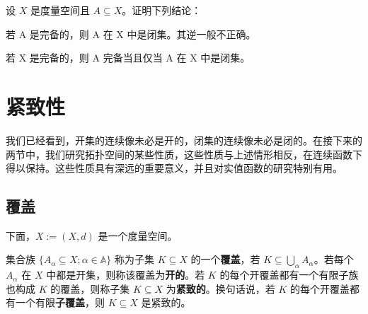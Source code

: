 \begin{exercises}
设 $X$ 是度量空间且 $A \subseteq X$。证明下列结论：

\begin{subitems}
\item

若 A 是完备的，则 A 在 X 中是闭集。其逆一般不正确。

\item

若 X 是完备的，则 A 完备当且仅当 A 在 X 中是闭集。

\end{subitems}

\end{exercises}

\section{紧致性}

我们已经看到，开集的连续像未必是开的，闭集的连续像未必是闭的。在接下来的两节中，我们研究拓扑空间的某些性质，这些性质与上述情形相反，在连续函数下得以保持。这些性质具有深远的重要意义，并且对实值函数的研究特别有用。

\subsection*{覆盖}

下面，$X := (X, d)$ 是一个度量空间。

集合族 $\{A_\alpha \subseteq X; \alpha \in \mathbb{A}\}$ 称为子集 $K \subseteq X$ 的一个\textbf{覆盖}，若 $K \subseteq \bigcup_\alpha A_\alpha$。若每个 $A_\alpha$ 在 $X$ 中都是开集，则称该覆盖为\textbf{开的}。若 $K$ 的每个开覆盖都有一个有限子族也构成 $K$ 的覆盖，则称子集 $K \subseteq X$ 为\textbf{紧致的}。换句话说，若 $K$ 的每个开覆盖都有一个有限\textbf{子覆盖}，则 $K \subseteq X$ 是紧致的。

